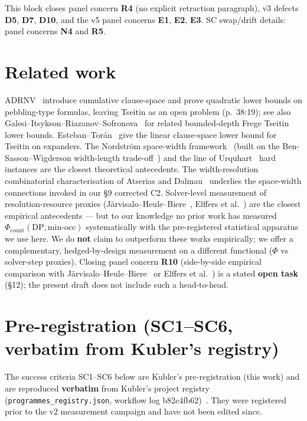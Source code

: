 \documentclass[11pt,a4paper]{article}
\theoremstyle{remark}
\begin{document}
This block closes panel concern \textbf{R4} (no explicit retraction
paragraph), v3 defects \textbf{D5}, \textbf{D7}, \textbf{D10}, and the v5
panel concerns \textbf{E1}, \textbf{E2}, \textbf{E3}. SC swap/drift
details: panel concerns \textbf{N4} and \textbf{R5}.

\section{Related work}

ADRNV~\cite{ADRNV2017} introduce cumulative clause-space and prove
quadratic lower bounds on pebbling-type formulas, leaving Tseitin as an
open problem (p.~38:19); see also
Galesi--Itsykson--Riazanov--Sofronova~\cite{GIRS2023} for related
bounded-depth Frege Tseitin lower bounds. Esteban--Tor\'an~\cite{EstebanToran1999} give
the linear clause-space lower bound for Tseitin on expanders. The
Nordstr\"om space-width framework~\cite{Nordstrom2013} (built on the
Ben-Sasson--Wigderson width-length trade-off~\cite{BSW2001}) and the line of
Urquhart~\cite{Urquhart1987} hard instances are the closest theoretical
antecedents. The width-resolution combinatorial characterisation of
Atserias and Dalmau~\cite{AtseriasDalmau2008} underlies the
space-width connections invoked in our \S9 corrected C2.
Solver-level measurement of resolution-resource proxies
(J\"arvisalo--Heule--Biere~\cite{JHB2012},
Elffers et al.~\cite{Elffers2018}) are the closest empirical
antecedents --- but to our knowledge no prior work has measured
$\Phi_{\mathrm{count}}(\mathrm{DP}, \mathrm{min\text{-}occ})$
systematically with the pre-registered statistical apparatus we use here.
We do \textbf{not} claim to outperform these works empirically; we offer
a complementary, hedged-by-design measurement on a different functional
($\Phi$ vs solver-step proxies). Closing panel concern \textbf{R10}
(side-by-side empirical comparison with
J\"arvisalo--Heule--Biere~\cite{JHB2012} or
Elffers et al.~\cite{Elffers2018}) is a stated \textbf{open task} (\S12);
the present draft does not include such a head-to-head.

\clearpage
\section{Pre-registration (SC1--SC6, verbatim from Kubler's registry)}

The success criteria SC1--SC6 below are Kubler's pre-registration
(this work) and are reproduced \textbf{verbatim} from Kubler's
project registry (\texttt{programmes\_registry.json}, workflow log
b82c4fb62)~\cite{KublerSperimentalMath}. They were registered prior to
the v2 measurement campaign and have not been edited since.
\end{document}

